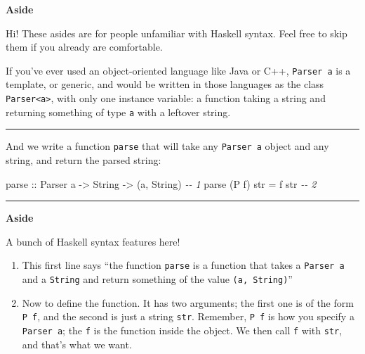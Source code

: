 \documentclass[]{article}
\newenvironment{Shaded}{}{}
\newcommand{\CommentTok}[1]{\textcolor[rgb]{0.38,0.63,0.69}{\textit{#1}}}
\newcommand{\DataTypeTok}[1]{\textcolor[rgb]{0.56,0.13,0.00}{#1}}
\newcommand{\NormalTok}[1]{#1}
\newcommand{\OtherTok}[1]{\textcolor[rgb]{0.00,0.44,0.13}{#1}}
\begin{document}
\textbf{Aside}

Hi! These asides are for people unfamiliar with Haskell syntax. Feel free to
skip them if you already are comfortable.

If you've ever used an object-oriented language like Java or C++,
\texttt{Parser\ a} is a template, or generic, and would be written in those
languages as the class \texttt{Parser\textless{}a\textgreater{}}, with only one
instance variable: a function taking a string and returning something of type
\texttt{a} with a leftover string.

\begin{center}\rule{0.5\linewidth}{0.5pt}\end{center}

And we write a function \texttt{parse} that will take any \texttt{Parser\ a}
object and any string, and return the parsed string:

\begin{Shaded}
\begin{Highlighting}[]
\OtherTok{parse ::} \DataTypeTok{Parser}\NormalTok{ a }\OtherTok{{-}\textgreater{}} \DataTypeTok{String} \OtherTok{{-}\textgreater{}}\NormalTok{ (a, }\DataTypeTok{String}\NormalTok{)              }\CommentTok{{-}{-} 1}
\NormalTok{parse (}\DataTypeTok{P}\NormalTok{ f) str }\OtherTok{=}\NormalTok{ f str                                 }\CommentTok{{-}{-} 2}
\end{Highlighting}
\end{Shaded}

\begin{center}\rule{0.5\linewidth}{0.5pt}\end{center}

\textbf{Aside}

A bunch of Haskell syntax features here!

\begin{enumerate}
\def\labelenumi{\arabic{enumi}.}
\item
  This first line says ``the function \texttt{parse} is a function that takes a
  \texttt{Parser\ a} and a \texttt{String} and return something of the value
  \texttt{(a,\ String)}''
\item
  Now to define the function. It has two arguments; the first one is of the form
  \texttt{P\ f}, and the second is just a string \texttt{str}. Remember,
  \texttt{P\ f} is how you specify a \texttt{Parser\ a}; the \texttt{f} is the
  function inside the object. We then call \texttt{f} with \texttt{str}, and
  that's what we want.
\end{enumerate}
\end{document}
